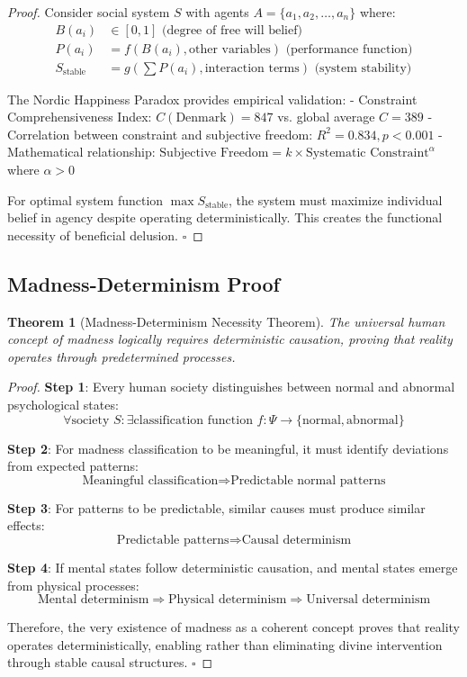 \documentclass[12pt,a4paper]{article}
\newtheorem{theorem}{Theorem}[section]
\begin{document}
\begin{proof}
Consider social system $S$ with agents $A = \{a_1, a_2, \ldots, a_n\}$ where:
\begin{align}
B(a_i) &\in [0,1] \text{ (degree of free will belief)}\\
P(a_i) &= f(B(a_i), \text{other variables}) \text{ (performance function)}\\
S_{\text{stable}} &= g\left(\sum P(a_i), \text{interaction terms}\right) \text{ (system stability)}
\end{align}

The Nordic Happiness Paradox provides empirical validation:
- Constraint Comprehensiveness Index: $C(\text{Denmark}) = 847$ vs. global average $C = 389$
- Correlation between constraint and subjective freedom: $R^2 = 0.834, p < 0.001$
- Mathematical relationship: $\text{Subjective Freedom} = k \times \text{Systematic Constraint}^{\alpha}$ where $\alpha > 0$

For optimal system function $\max S_{\text{stable}}$, the system must maximize individual belief in agency despite operating deterministically. This creates the functional necessity of beneficial delusion. $\square$
\end{proof}

\subsection{Madness-Determinism Proof}

\begin{theorem}[Madness-Determinism Necessity Theorem]
The universal human concept of madness logically requires deterministic causation, proving that reality operates through predetermined processes.
\end{theorem}

\begin{proof}
\textbf{Step 1}: Every human society distinguishes between normal and abnormal psychological states:
$$\forall \text{society } S: \exists \text{classification function } f: \Psi \rightarrow \{\text{normal}, \text{abnormal}\}$$

\textbf{Step 2}: For madness classification to be meaningful, it must identify deviations from expected patterns:
$$\text{Meaningful classification} \Rightarrow \text{Predictable normal patterns}$$

\textbf{Step 3}: For patterns to be predictable, similar causes must produce similar effects:
$$\text{Predictable patterns} \Rightarrow \text{Causal determinism}$$

\textbf{Step 4}: If mental states follow deterministic causation, and mental states emerge from physical processes:
$$\text{Mental determinism} \Rightarrow \text{Physical determinism} \Rightarrow \text{Universal determinism}$$

Therefore, the very existence of madness as a coherent concept proves that reality operates deterministically, enabling rather than eliminating divine intervention through stable causal structures. $\square$
\end{proof}
\end{document}
